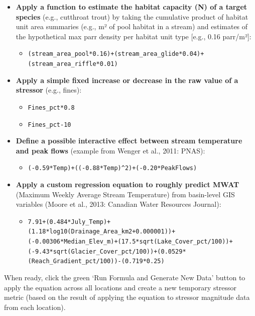 \documentclass[
  letterpaper,
  DIV=11,
  numbers=noendperiod]{scrreprt}
\providecommand{\tightlist}{%
  \setlength{\itemsep}{0pt}\setlength{\parskip}{0pt}}
\begin{document}
\begin{itemize}
\tightlist
\item
  \textbf{Apply a function to estimate the habitat capacity (N) of a
  target species} (e.g., cutthroat trout) by taking the cumulative
  product of habitat unit area summaries (e.g., m² of pool habitat in a
  stream) and estimates of the hypothetical max parr density per habitat
  unit type {[}e.g., 0.16 parr/m²{]}:

  \begin{itemize}
  \tightlist
  \item
    \texttt{(stream\_area\_pool*0.16)+(stream\_area\_glide*0.04)+(stream\_area\_riffle*0.01)}
  \end{itemize}
\item
  \textbf{Apply a simple fixed increase or decrease in the raw value of
  a stressor} (e.g., fines):

  \begin{itemize}
  \tightlist
  \item
    \texttt{Fines\_pct*0.8}
  \item
    \texttt{Fines\_pct-10}
  \end{itemize}
\item
  \textbf{Define a possible interactive effect between stream
  temperature and peak flows} (example from Wenger et al., 2011: PNAS):

  \begin{itemize}
  \tightlist
  \item
    \texttt{(-0.59*Temp)+((-0.88*Temp)\^{}2)+(-0.20*PeakFlows)}
  \end{itemize}
\item
  \textbf{Apply a custom regression equation to roughly predict MWAT}
  (Maximum Weekly Average Stream Temperature) from basin-level GIS
  variables (Moore et al., 2013: Canadian Water Resources Journal):

  \begin{itemize}
  \tightlist
  \item
    \texttt{7.91+(0.484*July\_Temp)+(1.18*log10(Drainage\_Area\_km2+0.000001))+(-0.00306*Median\_Elev\_m)+(17.5*sqrt(Lake\_Cover\_pct/100))+(-9.43*sqrt(Glacier\_Cover\_pct/100))+(0.0529*(Reach\_Gradient\_pct/100))-(0.719*0.25)}
  \end{itemize}
\end{itemize}

When ready, click the green `Run Formula and Generate New Data' button
to apply the equation across all locations and create a new temporary
stressor metric (based on the result of applying the equation to
stressor magnitude data from each location).
\end{document}
